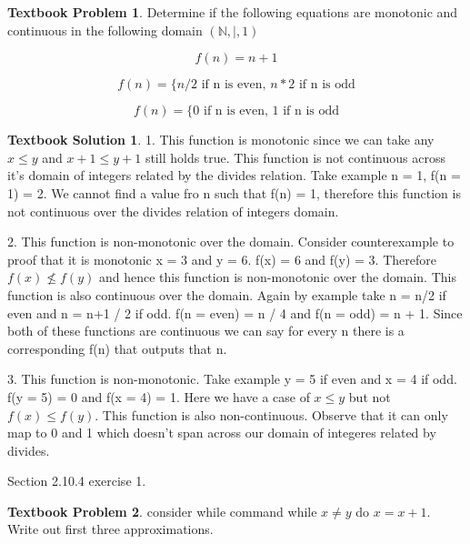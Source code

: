 \documentclass[10pt]{article}
\theoremstyle{definition}
\newtheorem{bp}{Textbook Problem}
\newtheorem{ts}{Textbook Solution}
\begin{document}
  
\begin{bp}
    Determine if the following equations are monotonic and continuous in the following domain $(\mathds{N},|, 1)$
    
    \begin{equation}
        f(n) = n + 1
    \end{equation}
    
    \begin{equation}
    f(n) = \{ n/2 \textrm{ if n is even, } n*2 \textrm{ if n is odd}
    \end{equation}
    
    \begin{equation}
        f(n) = \{ 0 \textrm{ if n is even, } 1 \textrm{ if n is odd}
    \end{equation}
  
\end{bp}
  
\begin{ts}
1. This function is monotonic since we can take any $x \leq y$ and $x + 1 \leq y + 1$ still holds true. This function is not continuous across it's domain of integers related by the divides relation. Take example n = 1, f(n = 1) = 2. We cannot find a value fro n such that f(n) = 1, therefore this function is not continuous over the divides relation of integers domain. 

2. This function is non-monotonic over the domain. Consider counterexample to proof that it is monotonic x = 3 and y = 6. f(x) = 6 and f(y) = 3. Therefore $f(x) \not \leq f(y)$ and hence this function is non-monotonic over the domain. This function is also continuous over the domain. Again by example take n = n/2 if even and n = n+1 / 2 if odd. f(n = even) = n / 4 and f(n = odd) = n + 1. Since both of these functions are continuous we can say for every n there is a corresponding f(n) that outputs that n. 

3. This function is non-monotonic. Take example y = 5 if even and x = 4 if odd. f(y = 5) = 0 and f(x = 4) = 1. Here we have a case of $x \leq y$ but not $f(x) \leq f(y)$. This function is also non-continuous. Observe that it can only map to 0 and 1 which doesn't span across our domain of integeres related by divides. 
\end{ts}

  

  Section 2.10.4 exercise 1.

  

  \begin{bp}

  

  consider while command while $ x \neq y $ do $x = x + 1 $. Write out first three approximations.

  \end{bp}
\end{document}
